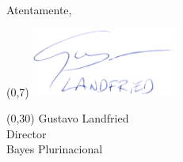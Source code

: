 \documentclass[a4paper,11pt]{letter}
\begin{document}
\begin{letter}
Atentamente,

\vspace{1.3cm}

\begin{textblock}{80}(0,7)
\phantom{.} \hfill \includegraphics[width=4.8cm]{firma.png}\hspace{2cm}\phantom{.} \\[0cm]
\end{textblock}
\begin{textblock}{80}(0,30)
 \phantom{.} \hfill Gustavo Landfried \hspace{2.5cm}\phantom{.}\\ \small
\phantom{.} \hfill Director \hspace{2.5cm}\phantom{.}\\
\phantom{.} \hfill Bayes Plurinacional \hspace{2.5cm}\phantom{.}\\
\end{textblock}
%
%

%
%


 \vspace{0.8cm}
\small




 \end{letter}
\end{document}
